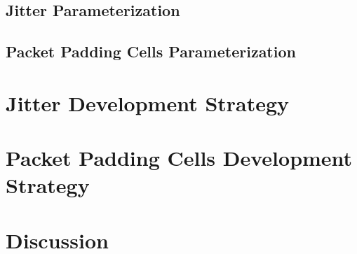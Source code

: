 \subsection{Jitter Parameterization}\label{sec:jitter_parameterization}

\subsection{Packet Padding Cells Parameterization}\label{sec:packet_padding_parameterization}

\section{Jitter Development Strategy}\label{sec:jitter_development_strategy}

\section{Packet Padding Cells Development Strategy}\label{sec:packet_padding_cells_development_strategy}

\section{Discussion}\label{sec:architeture_discussion}